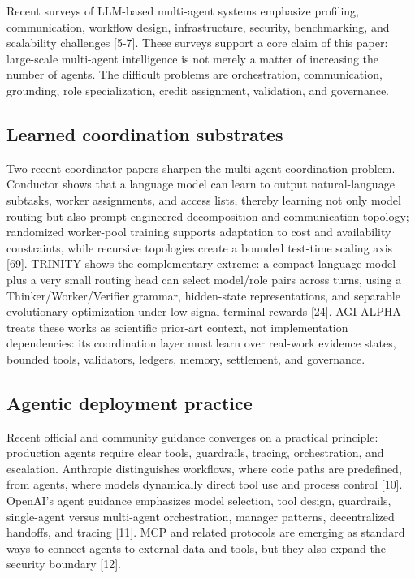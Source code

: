 \documentclass[11pt]{article}
\begin{document}
Recent surveys of LLM-based multi-agent systems emphasize profiling,
communication, workflow design, infrastructure, security, benchmarking,
and scalability challenges {[}5-7{]}. These surveys support a core claim
of this paper: large-scale multi-agent intelligence is not merely a
matter of increasing the number of agents. The difficult problems are
orchestration, communication, grounding, role specialization, credit
assignment, validation, and governance.

\subsection{Learned coordination
substrates}\label{learned-coordination-substrates}

Two recent coordinator papers sharpen the multi-agent coordination
problem. Conductor shows that a language model can learn to output
natural-language subtasks, worker assignments, and access lists, thereby
learning not only model routing but also prompt-engineered decomposition
and communication topology; randomized worker-pool training supports
adaptation to cost and availability constraints, while recursive
topologies create a bounded test-time scaling axis {[}69{]}. TRINITY
shows the complementary extreme: a compact language model plus a very
small routing head can select model/role pairs across turns, using a
Thinker/Worker/Verifier grammar, hidden-state representations, and
separable evolutionary optimization under low-signal terminal rewards
{[}24{]}. AGI ALPHA treats these works as scientific prior-art context,
not implementation dependencies: its coordination layer must learn over
real-work evidence states, bounded tools, validators, ledgers, memory,
settlement, and governance.

\subsection{Agentic deployment
practice}\label{agentic-deployment-practice}

Recent official and community guidance converges on a practical
principle: production agents require clear tools, guardrails, tracing,
orchestration, and escalation. Anthropic distinguishes workflows, where
code paths are predefined, from agents, where models dynamically direct
tool use and process control {[}10{]}. OpenAI's agent guidance
emphasizes model selection, tool design, guardrails, single-agent versus
multi-agent orchestration, manager patterns, decentralized handoffs, and
tracing {[}11{]}. MCP and related protocols are emerging as standard
ways to connect agents to external data and tools, but they also expand
the security boundary {[}12{]}.
\end{document}
